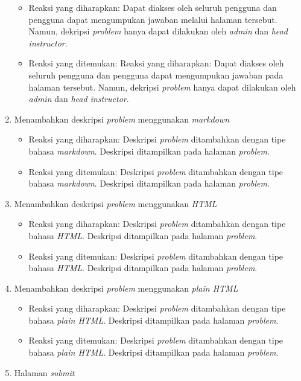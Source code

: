 \begin{enumerate}
	 \begin{itemize}
	 	\item Reaksi yang diharapkan: Dapat diakses oleh seluruh pengguna dan pengguna dapat mengumpukan jawaban melalui halaman tersebut. Namun, dekripsi \textit{problem} hanya dapat dilakukan oleh \textit{admin} dan \textit{head instructor}.
	 	\item Reaksi yang ditemukan: Reaksi yang diharapkan: Dapat diakses oleh seluruh pengguna dan pengguna dapat mengumpukan jawaban pada halaman tersebut. Namun, dekripsi \textit{problem} hanya dapat dilakukan oleh \textit{admin} dan \textit{head instructor}.
	 \end{itemize}
	 \item Menambahkan deskripsi \textit{problem} menggunakan \textit{markdown}
	 \begin{itemize}
	 	\item Reaksi yang diharapkan: Deskripsi \textit{problem} ditambahkan dengan tipe bahasa \textit{markdown}. Deskripsi ditampilkan pada halaman \textit{problem}.
	 	\item Reaksi yang ditemukan: Deskripsi \textit{problem} ditambahkan dengan tipe bahasa \textit{markdown}. Deskripsi ditampilkan pada halaman \textit{problem}.
	 \end{itemize}
	\item Menambahkan deskripsi \textit{problem} menggunakan \textit{HTML}
	 \begin{itemize}
	 	\item Reaksi yang diharapkan: Deskripsi \textit{problem} ditambahkan dengan tipe bahasa \textit{HTML}. Deskripsi ditampilkan pada halaman \textit{problem}.
	 	\item Reaksi yang ditemukan: Deskripsi \textit{problem} ditambahkan dengan tipe bahasa \textit{HTML}. Deskripsi ditampilkan pada halaman \textit{problem}.
	 \end{itemize}
	 \item Menambahkan deskripsi \textit{problem} menggunakan \textit{plain HTML}
	 \begin{itemize}
	 	\item Reaksi yang diharapkan: Deskripsi \textit{problem} ditambahkan dengan tipe bahasa \textit{plain HTML}. Deskripsi ditampilkan pada halaman \textit{problem}.
	 	\item Reaksi yang ditemukan: Deskripsi \textit{problem} ditambahkan dengan tipe bahasa \textit{plain HTML}. Deskripsi ditampilkan pada halaman \textit{problem}.
	 \end{itemize}
	 \item Halaman \textit{submit}

\end{enumerate}
